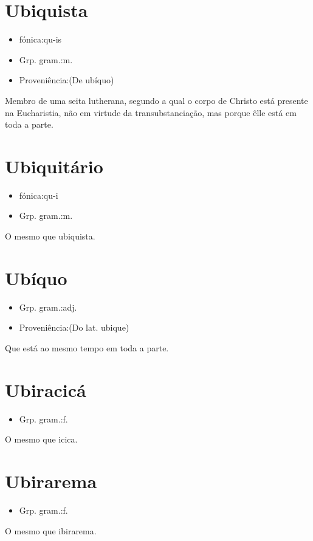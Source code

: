 \documentclass{article}
\begin{document}
\section{Ubiquista}
\begin{itemize}
\item {fónica:qu-is}
\end{itemize}
\begin{itemize}
\item {Grp. gram.:m.}
\end{itemize}
\begin{itemize}
\item {Proveniência:(De \textunderscore ubíquo\textunderscore )}
\end{itemize}
Membro de uma seita lutherana, segundo a qual o corpo de Christo está presente na Eucharistia, não em virtude da transubstanciação, mas porque êlle está em toda a parte.
\section{Ubiquitário}
\begin{itemize}
\item {fónica:qu-i}
\end{itemize}
\begin{itemize}
\item {Grp. gram.:m.}
\end{itemize}
O mesmo que \textunderscore ubiquista\textunderscore .
\section{Ubíquo}
\begin{itemize}
\item {Grp. gram.:adj.}
\end{itemize}
\begin{itemize}
\item {Proveniência:(Do lat. \textunderscore ubique\textunderscore )}
\end{itemize}
Que está ao mesmo tempo em toda a parte.
\section{Ubiracicá}
\begin{itemize}
\item {Grp. gram.:f.}
\end{itemize}
O mesmo que \textunderscore icica\textunderscore .
\section{Ubirarema}
\begin{itemize}
\item {Grp. gram.:f.}
\end{itemize}
O mesmo que \textunderscore ibirarema\textunderscore .
\end{document}
